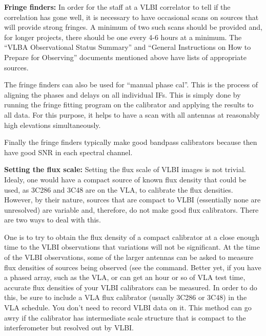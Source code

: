 \documentclass{report}
\begin{document}
\begin{list}{}{\parsep .5em  \itemsep .5em }

\item {\bf Fringe finders:} In order for the staff at a VLBI
correlator to tell if the correlation has gone well, it is necessary
to have occasional scans on sources that will provide strong fringes.
A minimum of two such scans should be provided and, for longer
projects, there should be one every 4-6 hours at a minimum.  The
``VLBA Observational Status Summary'' and ``General Instructions on
How to Prepare for Observing'' documents mentioned above have lists of
appropriate sources.

The fringe finders can also be used for ``manual phase cal''.  This is
the process of aligning the phases and delays on all individual IFs.
This is simply done by running the fringe fitting program on the
calibrator and applying the results to all data.  For this purpose, it
helps to have a scan with all antennas at reasonably high elevations
simultaneously.

Finally the fringe finders typically make good bandpass calibrators
because then have good SNR in each spectral channel.

\item {\bf Setting the flux scale:} Setting the flux scale of VLBI
images is not trivial.  Idealy, one would have a compact source of
known flux density that could be used, as 3C286 and 3C48 are on the
VLA, to calibrate the flux densities.  However, by their nature, sources
that are compact to VLBI (essentially none are unresolved) are variable
and, therefore, do not make good flux calibrators.  There are two ways
to deal with this.

One is to try to obtain the flux density of a compact calibrator at a
close enough time to the VLBI observations that variations will not be
significant.  At the time of the VLBI observations, some of the larger
antennas can be asked to measure flux densities of sources being
observed (see the  command.  Better yet,
if you have a phased array, such as the VLA, or can get an hour or so of
VLA test time, accurate flux densities of your VLBI calibrators can be
measured.  In order to do this, be sure to include a VLA flux calibrator
(usually 3C286 or 3C48) in the VLA schedule.  You don't need to
record VLBI data on it.  This method can go awry if the calibrator has
intermediate scale structure that is compact to the interferometer but 
resolved out by VLBI.


\end{list}
\end{document}

